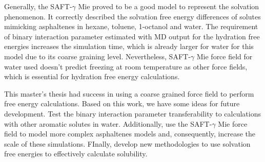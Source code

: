 Generally, the SAFT-$\gamma$ Mie proved to be a good model to represent the solvation phenomenon. It correctly described the solvation free energy differences of solutes mimicking asphaltenes in hexane, toluene, 1-octanol and water. The requirement of binary interaction parameter estimated with MD  output for the hydration free energies increases the simulation time, which is already larger for water for this model due to its coarse graining level. Nevertheless, SAFT-$\gamma$ Mie force field for water used doesn't predict freezing at room temperature as other force fields, which is essential for hydration free energy calculations.

This master's thesis had success in using a coarse grained force field to perform free energy calculations. Based on this work, we have some ideas for future development. Test the binary interaction parameter transferability to calculations with other aromatic solutes in water. Additionally, use the SAFT-$\gamma$ Mie force field to model more complex asphaltenes models and, consequently, increase the scale of these simulations. FInally, develop new methodologies to use solvation free energies to effectively calculate solubility. 
 


